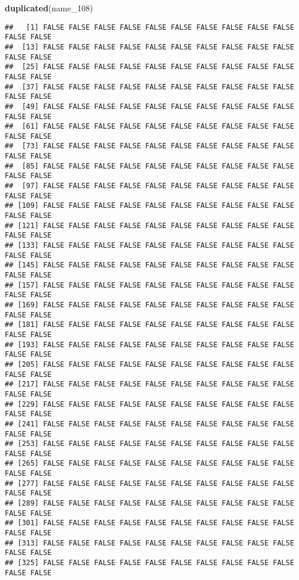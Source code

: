 \documentclass[
]{article}
\newenvironment{Shaded}{\begin{snugshade}}{\end{snugshade}}
\newcommand{\FunctionTok}[1]{\textcolor[rgb]{0.13,0.29,0.53}{\textbf{#1}}}
\newcommand{\NormalTok}[1]{#1}
\begin{document}
\begin{Shaded}
\begin{Highlighting}[]
\FunctionTok{duplicated}\NormalTok{(name\_108)}
\end{Highlighting}
\end{Shaded}

\begin{verbatim}
##   [1] FALSE FALSE FALSE FALSE FALSE FALSE FALSE FALSE FALSE FALSE FALSE FALSE
##  [13] FALSE FALSE FALSE FALSE FALSE FALSE FALSE FALSE FALSE FALSE FALSE FALSE
##  [25] FALSE FALSE FALSE FALSE FALSE FALSE FALSE FALSE FALSE FALSE FALSE FALSE
##  [37] FALSE FALSE FALSE FALSE FALSE FALSE FALSE FALSE FALSE FALSE FALSE FALSE
##  [49] FALSE FALSE FALSE FALSE FALSE FALSE FALSE FALSE FALSE FALSE FALSE FALSE
##  [61] FALSE FALSE FALSE FALSE FALSE FALSE FALSE FALSE FALSE FALSE FALSE FALSE
##  [73] FALSE FALSE FALSE FALSE FALSE FALSE FALSE FALSE FALSE FALSE FALSE FALSE
##  [85] FALSE FALSE FALSE FALSE FALSE FALSE FALSE FALSE FALSE FALSE FALSE FALSE
##  [97] FALSE FALSE FALSE FALSE FALSE FALSE FALSE FALSE FALSE FALSE FALSE FALSE
## [109] FALSE FALSE FALSE FALSE FALSE FALSE FALSE FALSE FALSE FALSE FALSE FALSE
## [121] FALSE FALSE FALSE FALSE FALSE FALSE FALSE FALSE FALSE FALSE FALSE FALSE
## [133] FALSE FALSE FALSE FALSE FALSE FALSE FALSE FALSE FALSE FALSE FALSE FALSE
## [145] FALSE FALSE FALSE FALSE FALSE FALSE FALSE FALSE FALSE FALSE FALSE FALSE
## [157] FALSE FALSE FALSE FALSE FALSE FALSE FALSE FALSE FALSE FALSE FALSE FALSE
## [169] FALSE FALSE FALSE FALSE FALSE FALSE FALSE FALSE FALSE FALSE FALSE FALSE
## [181] FALSE FALSE FALSE FALSE FALSE FALSE FALSE FALSE FALSE FALSE FALSE FALSE
## [193] FALSE FALSE FALSE FALSE FALSE FALSE FALSE FALSE FALSE FALSE FALSE FALSE
## [205] FALSE FALSE FALSE FALSE FALSE FALSE FALSE FALSE FALSE FALSE FALSE FALSE
## [217] FALSE FALSE FALSE FALSE FALSE FALSE FALSE FALSE FALSE FALSE FALSE FALSE
## [229] FALSE FALSE FALSE FALSE FALSE FALSE FALSE FALSE FALSE FALSE FALSE FALSE
## [241] FALSE FALSE FALSE FALSE FALSE FALSE FALSE FALSE FALSE FALSE FALSE FALSE
## [253] FALSE FALSE FALSE FALSE FALSE FALSE FALSE FALSE FALSE FALSE FALSE FALSE
## [265] FALSE FALSE FALSE FALSE FALSE FALSE FALSE FALSE FALSE FALSE FALSE FALSE
## [277] FALSE FALSE FALSE FALSE FALSE FALSE FALSE FALSE FALSE FALSE FALSE FALSE
## [289] FALSE FALSE FALSE FALSE FALSE FALSE FALSE FALSE FALSE FALSE FALSE FALSE
## [301] FALSE FALSE FALSE FALSE FALSE FALSE FALSE FALSE FALSE FALSE FALSE FALSE
## [313] FALSE FALSE FALSE FALSE FALSE FALSE FALSE FALSE FALSE FALSE FALSE FALSE
## [325] FALSE FALSE FALSE FALSE FALSE FALSE FALSE FALSE FALSE FALSE FALSE FALSE

\end{verbatim}
\end{document}
